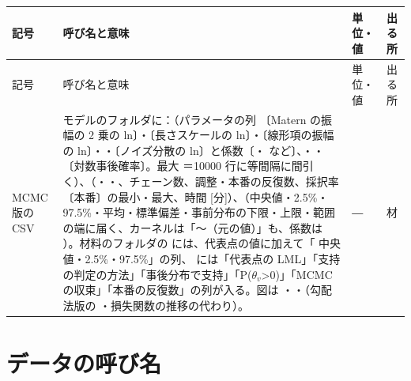 \documentclass[paper=a4paper,fontsize=10.5pt,line_length=44zw,number_of_lines=38]{jlreq}
\makeatletter
\newcommand{\file}[1]{\texttt{\detokenize{#1}}}
\newenvironment{symtab}{%
  \begin{longtable}{@{}>{\raggedright\arraybackslash}p{6.5\zw}>{\raggedright\arraybackslash}p{22\zw}>{\raggedright\arraybackslash}p{6\zw}>{\raggedright\arraybackslash}p{4.5\zw}@{}}
  \toprule 記号 & 呼び名と意味 & 単位・値 & 出る所 \\ \midrule \endfirsthead
  \toprule 記号 & 呼び名と意味 & 単位・値 & 出る所 \\ \midrule \endhead
  \bottomrule \endlastfoot}{\end{longtable}}
\makeatother
\begin{document}
\begin{symtab}
MCMC 版の CSV & モデルのフォルダに：\file{MCMC_事後サンプル.csv}（パラメータの列 \file{ln_amp2}〔Matern の振幅の 2 乗の ln〕・\file{ln_ls_<入力>}〔長さスケールの ln〕・\file{ln_lin_c}〔線形項の振幅の ln〕・\file{ln_lin_sigma0}・\file{ln_noise}〔ノイズ分散の ln〕と係数〔\file{E_h}・\file{E_v} など〕、\file{chain}・\file{draw}・\file{lp}〔対数事後確率〕。最大 \file{MCMC_SAVE_ROWS}＝10000 行に等間隔に間引く）、\file{MCMC_収束の診断.csv}（\file{r_hat}・\file{ess_bulk}・\file{ess_tail}、チェーン数、調整・本番の反復数、採択率〔本番〕の最小・最大、時間 [分]）、\file{事後分布の要約.csv}（中央値・2.5\%・97.5\%・平均・標準偏差・事前分布の下限・上限・範囲の端に届く、カーネルは「〜（元の値）」も、係数は \file{P(>0)}）。材料のフォルダの \file{ハイパーパラメータ.csv} には、代表点の値に加えて「\file{<名前>} 中央値・2.5\%・97.5\%」の列、\file{まとめ.csv} には「代表点の LML」「支持の判定の方法」「事後分布で支持」「P($\theta_v$>0)」「MCMC の収束」「本番の反復数」の列が入る。図は \file{事後分布_係数.png}・\file{事後分布_ハイパーパラメータ.png}・\file{MCMC_トレース.png}（勾配法版の \file{プロファイル尤度.png}・損失関数の推移の代わり）。 & ― & 材 \\
\end{symtab}

\section{データの呼び名}
\end{document}
